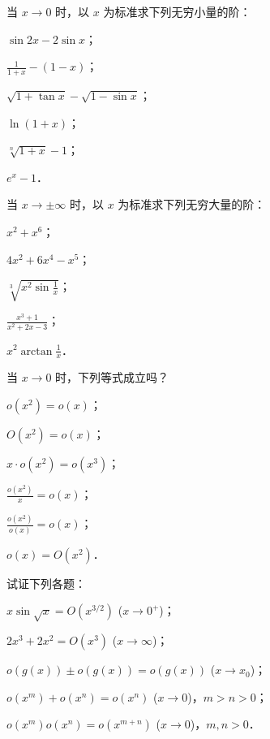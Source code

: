 \begin{xiti}
\item 当 $x \to 0$ 时，以 $x$ 为标准求下列无穷小量的阶：
\begin{ziti}
\item $\sin 2x - 2\sin x$；
\item $\frac{1}{1+x} - (1 - x)$；
\item $\sqrt{1 + \tan x} - \sqrt{1 - \sin x}$；
\item $\ln(1+x)$；
\item $\sqrt[n]{1+x} - 1$；
\item $e^x - 1$．
\end{ziti}

\item 当 $x \to \pm \infty$ 时，以 $x$ 为标准求下列无穷大量的阶：
\begin{ziti}
\item $x^2 + x^6$；
\item $4x^2 + 6x^4 - x^5$；
\item $\sqrt[3]{x^2\sin\frac{1}{x}}$；
\item $\frac{x^3+1}{x^2+2x-3}$；
\item $x^2 \arctan\frac{1}{x}$．
\end{ziti}

\item 当 $x \to 0$ 时，下列等式成立吗？
\begin{ziti}
\item $o(x^2) = o(x)$；
\item $O(x^2) = o(x)$；
\item $x \cdot o(x^2) = o(x^3)$；
\item $\frac{o(x^2)}{x} = o(x)$；
\item $\frac{o(x^2)}{o(x)} = o(x)$；
\item $o(x) = O(x^2)$．
\end{ziti}

\item 试证下列各题：
\begin{ziti}
\item $x\sin\sqrt{x} = O(x^{3/2})$ ($x \to 0^+$)；
\item $2x^3 + 2x^2 = O(x^3)$ ($x \to \infty$)；
\item $o(g(x)) \pm o(g(x)) = o(g(x))$ ($x \to x_0$)；
\item $o(x^m) + o(x^n) = o(x^n)$ ($x \to 0$)，$m > n > 0$；
\item $o(x^m)o(x^n) = o(x^{m+n})$ ($x \to 0$)，$m, n > 0$．
\end{ziti}


\end{xiti}
